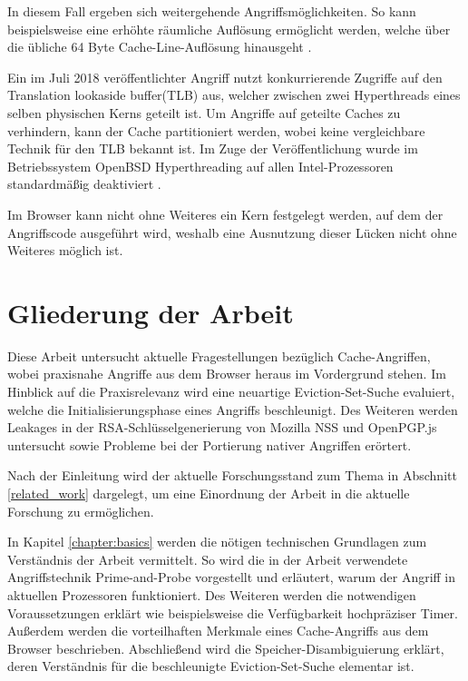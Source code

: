 In diesem Fall ergeben sich weitergehende Angriffsmöglichkeiten.
So kann beispielsweise eine erhöhte räumliche Auflösung ermöglicht werden, welche über die übliche 64 Byte Cache-Line-Auflösung hinausgeht \cite{MemJam}.

Ein im Juli 2018 veröffentlichter Angriff \cite{TLBleed} nutzt konkurrierende Zugriffe auf den Translation lookaside buffer(TLB) aus, welcher zwischen zwei Hyperthreads eines selben physischen Kerns geteilt ist.
Um Angriffe auf geteilte Caches zu verhindern, kann der Cache partitioniert werden, wobei keine vergleichbare Technik für den TLB bekannt ist.
Im Zuge der Veröffentlichung wurde im Betriebssystem OpenBSD Hyperthreading auf allen Intel-Prozessoren standardmäßig deaktiviert \cite{OpenBSDHyperthreading}.

Im Browser kann nicht ohne Weiteres ein Kern festgelegt werden, auf dem der Angriffscode ausgeführt wird, weshalb eine Ausnutzung dieser Lücken nicht ohne Weiteres möglich ist.

\section{Gliederung der Arbeit}

Diese Arbeit untersucht aktuelle Fragestellungen bezüglich Cache-Angriffen, wobei praxisnahe Angriffe aus dem Browser heraus im Vordergrund stehen.
Im Hinblick auf die Praxisrelevanz wird eine neuartige Eviction-Set-Suche evaluiert, welche die Initialisierungsphase eines Angriffs beschleunigt.
Des Weiteren werden Leakages in der RSA-Schlüsselgenerierung von Mozilla NSS und OpenPGP.js untersucht sowie Probleme bei der Portierung nativer Angriffen erörtert.

\par \medskip                         

Nach der Einleitung wird der aktuelle Forschungsstand zum Thema in Abschnitt \ref{related_work} dargelegt, um eine Einordnung der Arbeit in die aktuelle Forschung zu ermöglichen.

\par \medskip                     

In Kapitel \ref{chapter:basics} werden die nötigen technischen Grundlagen zum Verständnis der Arbeit vermittelt.
So wird die in der Arbeit verwendete Angriffstechnik Prime-and-Probe vorgestellt und erläutert, warum der Angriff in aktuellen Prozessoren funktioniert.
Des Weiteren werden die notwendigen Voraussetzungen erklärt wie beispielsweise die Verfügbarkeit hochpräziser Timer.
Außerdem werden die vorteilhaften Merkmale eines Cache-Angriffs aus dem Browser beschrieben.
Abschließend wird die Speicher-Disambiguierung erklärt, deren Verständnis für die beschleunigte Eviction-Set-Suche elementar ist.

